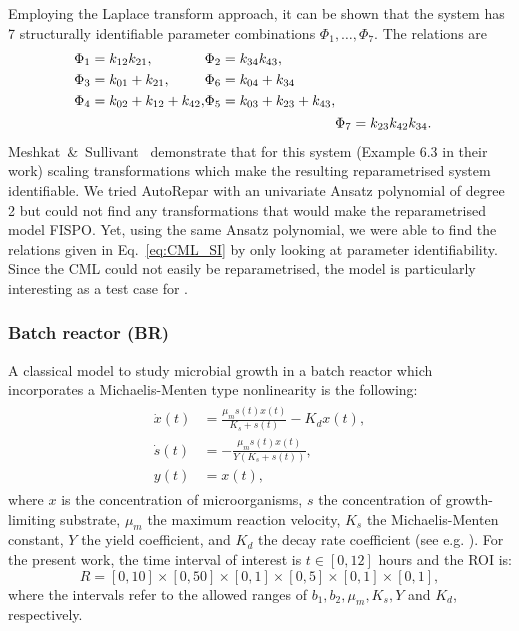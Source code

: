 Employing the Laplace transform approach, it can be shown that the system has 7 structurally identifiable parameter combinations $\Phi_{1},\ldots, \Phi_{7}$. 
The relations are
\begin{align} \label{eq:CML_SI}
    \begin{split}
        \Phi_{1} &=  k_{12} k_{21}, \\
        \Phi_{3} &=  k_{01} + k_{21}, \\
        \Phi_{4} &=  k_{02} + k_{12} + k_{42}, \\
    \end{split}
    \begin{split}
        \Phi_{2} &=  k_{34} k_{43}, \\
        \Phi_{6} &=  k_{04} + k_{34}\\
        \Phi_{5} &=  k_{03} + k_{23} + k_{43},
    \end{split} \\ 
    &\Phi_{7} =  k_{23} k_{42} k_{34}. \notag
\end{align}
Meshkat~\&~Sullivant~\cite{MESHKAT201446} demonstrate that for this system (Example 6.3 in their work)  scaling transformations  which make the resulting reparametrised system identifiable.
We tried AutoRepar with an univariate Ansatz polynomial of degree 2 but could not find any transformations that would make the reparametrised model FISPO. 
Yet, using the same Ansatz polynomial, we were able to find the relations given in Eq.~\eqref{eq:CML_SI} by only looking at parameter identifiability.
Since the CML could not easily be reparametrised, the model is particularly interesting as a test case for \myMethod{}. 

\subsubsection{Batch reactor (BR)}
A classical model  to study microbial growth in a batch reactor which incorporates a Michaelis-Menten type nonlinearity is the following:
\begin{align}
    \begin{split}
        \dot{x}(t) &= \frac{\mu_{m}s(t) x(t) }{K_{s} + s(t)} - K_{d} x(t), \\
        \dot{s}(t) &= -\frac{\mu_{m} s(t) x(t)}{Y(K_{s} + s(t))}, \\
        y(t) &= x(t),
    \end{split} \label{eq:BR_model}
\end{align}
where $x$ is the concentration of microorganisms, $s$ the concentration of growth-limiting substrate, $\mu_{m}$ the maximum reaction velocity, $K_{s}$ the Michaelis-Menten constant, $Y$ the yield coefficient, and $K_{d}$ the decay rate coefficient (see e.g. \cite{button1985kinetics}).
For the present work, the time interval of interest is $t \in [0, 12]$ hours and the ROI is:
\begin{equation}
    R = [0, 10] \times [0, 50] \times [0, 1] \times[0, 5] \times [0, 1] \times [0, 1], 
\end{equation}
where the intervals refer to the allowed ranges of $b_{1}, b_{2}, \mu_{m}, K_{s}, Y$ and $K_{d}$, respectively.

